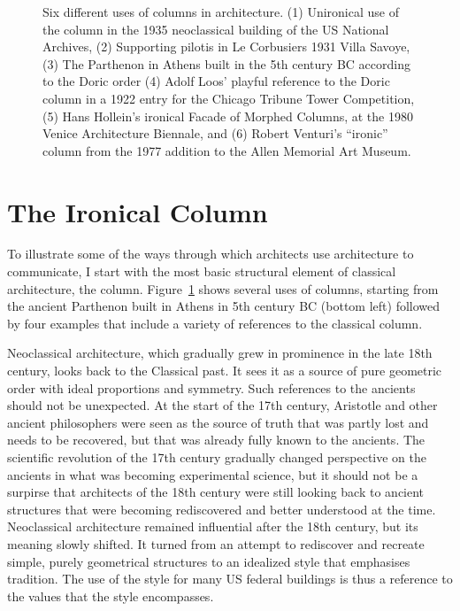 \begin{figure}
\caption{Six different uses of columns in architecture. (1) Unironical use of the column in the 1935
neoclassical building of the US National Archives, (2) Supporting pilotis in Le Corbusiers 1931
Villa Savoye, (3) The Parthenon in Athens built in the 5th century BC according to the Doric order
(4) Adolf Loos' playful reference to the Doric column in a 1922 entry for the Chicago Tribune
Tower Competition, (5) Hans Hollein's ironical Facade of Morphed Columns, at the 1980 Venice
Architecture Biennale, and (6) Robert Venturi's ``ironic'' column from the 1977 addition to the
Allen Memorial Art Museum.}
\label{fig:columns}
\end{figure}

\section{The Ironical Column}
To illustrate some of the ways through which architects use architecture to communicate, I start
with the most basic structural element of classical architecture, the column. Figure~\ref{fig:columns}
shows several uses of columns, starting from the ancient Parthenon built in Athens in 5th century
BC (bottom left) followed by four examples that include a variety of references to the classical
column.

Neoclassical architecture, which gradually grew in prominence in the late 18th century, looks
back to the Classical past. It sees it as a source of pure geometric order with ideal proportions
and symmetry. Such references to the ancients should not be unexpected. At the start of the 17th
century, Aristotle and other ancient philosophers were seen as the source of truth that was partly
lost and needs to be recovered, but that was already fully known to the ancients.
The scientific revolution of the 17th century gradually changed perspective on the ancients in what
was becoming experimental science, but it should not be a surpirse that architects of the 18th century
were still looking back to ancient structures that were becoming rediscovered and better understood
at the time. Neoclassical architecture remained influential after the 18th century, but its meaning
slowly shifted. It turned from an attempt to rediscover and recreate simple, purely geometrical
structures to an idealized style that emphasises tradition. The use of the style for many US federal
buildings is thus a reference to the values that the style encompasses.


